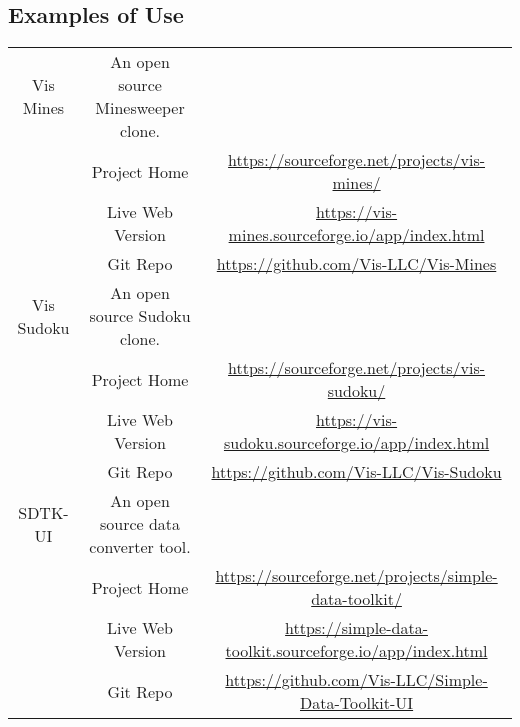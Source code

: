 \documentclass[11pt]{article}
\begin{document}
\subsection{Examples of Use}
\begin{center}
\begin{tabular}{ | c | c | c | }
\hline
Vis Mines & An open source Minesweeper clone. & \\
& \tiny Project Home \par & \tiny \href{https://sourceforge.net/projects/vis-mines/}{https://sourceforge.net/projects/vis-mines/} \par \\
& \tiny Live Web Version \par & \tiny \href{https://vis-mines.sourceforge.io/app/index.html}{https://vis-mines.sourceforge.io/app/index.html} \par \\
& \tiny Git Repo \par & \tiny \href{https://github.com/Vis-LLC/Vis-Mines}{https://github.com/Vis-LLC/Vis-Mines} \par \\
\hline
Vis Sudoku & An open source Sudoku clone. & \\
& \tiny Project Home \par & \tiny \href{https://sourceforge.net/projects/vis-sudoku/}{https://sourceforge.net/projects/vis-sudoku/} \par \\
& \tiny Live Web Version \par & \tiny \href{https://vis-sudoku.sourceforge.io/app/index.html}{https://vis-sudoku.sourceforge.io/app/index.html} \par \\
& \tiny Git Repo \par & \tiny \href{https://github.com/Vis-LLC/Vis-Sudoku}{https://github.com/Vis-LLC/Vis-Sudoku} \par \\
\hline
SDTK-UI & An open source data converter tool. & \\
& \tiny Project Home \par & \tiny \href{https://sourceforge.net/projects/simple-data-toolkit/}{https://sourceforge.net/projects/simple-data-toolkit/} \par \\
& \tiny Live Web Version \par & \tiny \href{https://simple-data-toolkit.sourceforge.io/app/index.html}{https://simple-data-toolkit.sourceforge.io/app/index.html} \par \\
& \tiny Git Repo \par & \tiny \href{https://github.com/Vis-LLC/Simple-Data-Toolkit-UI}{https://github.com/Vis-LLC/Simple-Data-Toolkit-UI} \par \\
\hline
\end{tabular}
\end{center}
\end{document}
